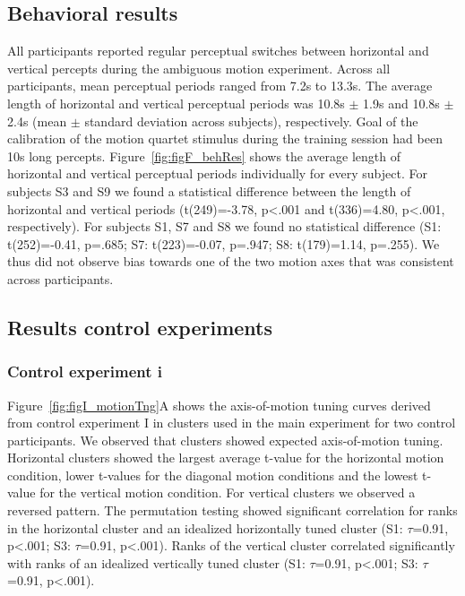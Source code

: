 \subsection{Behavioral results}
All participants reported regular perceptual switches between horizontal and vertical percepts during the ambiguous motion experiment. Across all participants, mean perceptual periods ranged from 7.2s to 13.3s. The average length of horizontal and vertical perceptual periods was 10.8s $\pm$ 1.9s and 10.8s $\pm$ 2.4s (mean $\pm$ standard deviation across subjects), respectively. Goal of the calibration of the motion quartet stimulus during the training session had been 10s long percepts. Figure~\ref{fig:figF_behRes} shows the average length of horizontal and vertical perceptual periods individually for every subject. For subjects S3 and S9 we found a statistical difference between the length of horizontal and vertical periods (t(249)=-3.78, p\textless.001 and t(336)=4.80, p\textless.001, respectively). For subjects S1, S7 and S8 we found no statistical difference (S1: t(252)=-0.41, p=.685; S7: t(223)=-0.07, p=.947; S8: t(179)=1.14, p=.255). We thus did not observe bias towards one of the two motion axes that was consistent across participants.

\subsection{Results control experiments}
\label{sec:rescontrol}
\subsubsection{Control experiment i}
Figure~\ref{fig:figI_motionTng}A shows the axis-of-motion tuning curves derived from control experiment I in clusters used in the main experiment for two control participants. We observed that clusters showed expected axis-of-motion tuning. Horizontal clusters showed the largest average t-value for the horizontal motion condition, lower t-values for the diagonal motion conditions and the lowest t-value for the vertical motion condition. For vertical clusters we observed a reversed pattern. The permutation testing showed significant correlation for ranks in the horizontal cluster and an idealized horizontally tuned cluster (S1: $\tau$=0.91, p\textless.001; S3: $\tau$=0.91, p\textless.001). Ranks of the vertical cluster correlated significantly with ranks of an idealized vertically tuned cluster (S1: $\tau$=0.91, p\textless.001; S3: $\tau$=0.91, p\textless.001).

